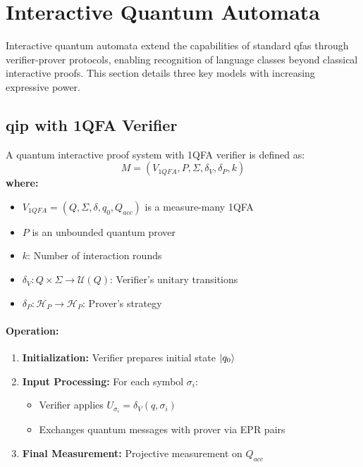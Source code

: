 \section{Interactive Quantum Automata}
\label{sec:interactive-quantum}

Interactive quantum automata extend the capabilities of standard \glspl{qfa} through verifier-prover protocols, enabling recognition of language classes beyond classical interactive proofs. This section details three key models with increasing expressive power.

\subsection{\acrfull{qip} with 1QFA Verifier}
\label{subsec:qip1qfa}

\begin{definition}
A quantum interactive proof system with 1QFA verifier is defined as:
\[
M = (V_{1QFA}, P, \Sigma, \delta_V, \delta_P, k)
\]
\textbf{where:}
\begin{itemize}
    \item $V_{1QFA} = (Q, \Sigma, \delta, q_0, Q_{acc})$ is a measure-many 1QFA
    \item $P$ is an unbounded quantum prover
    \item $k$: Number of interaction rounds
    \item $\delta_V: Q \times \Sigma \rightarrow \mathcal{U}(Q)$: Verifier's unitary transitions
    \item $\delta_P: \mathcal{H}_P \rightarrow \mathcal{H}_P$: Prover's strategy
\end{itemize}
\end{definition}

\paragraph{Operation:}
\begin{enumerate}
    \item \textbf{Initialization:} Verifier prepares initial state $\ket{q_0}$
    \item \textbf{Input Processing:} For each symbol $\sigma_i$:
    \begin{itemize}
        \item Verifier applies $U_{\sigma_i} = \delta_V(q, \sigma_i)$
        \item Exchanges quantum messages with prover via EPR pairs
    \end{itemize}
    \item \textbf{Final Measurement:} Projective measurement on $Q_{acc}$
\end{enumerate}

